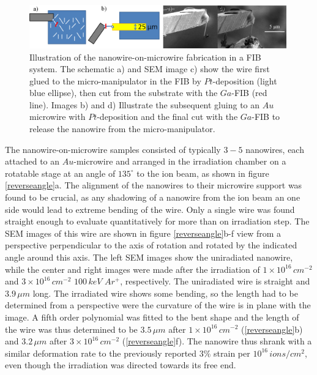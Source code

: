 \begin{figure}[thbp]
	\centering
		\includegraphics[width=0.99\textwidth]{images/reverseFIB.jpg}
	\caption{Illustration of the nanowire-on-microwire fabrication in a FIB system. The schematic a) and SEM image c) show the wire first glued to the micro-manipulator in the FIB by $Pt$-deposition (light blue ellipse), then cut from the substrate with the $Ga$-FIB (red line). Images b) and d) Illustrate the subsequent gluing to an $Au$ microwire with $Pt$-deposition and the final cut with the $Ga$-FIB to release the nanowire from the micro-manipulator.}
	\label{reverseFIB}
\end{figure}

The nanowire-on-microwire samples consisted of typically $3-5$ nanowires, each attached to an $Au$-microwire and arranged in the irradiation chamber on a rotatable stage at an angle of $135^\circ$ to the ion beam, as shown in figure \ref{reverseangle}a. The alignment of the nanowires to their microwire support was found to be crucial, as any shadowing of a nanowire from the ion beam an one side would lead to extreme bending of the wire. Only a single wire was found straight enough to evaluate quantitatively for more than on irradiation step. The SEM images of this wire are shown in figure \ref{reverseangle}b-f view from a perspective perpendicular to the axis of rotation and rotated by the indicated angle around this axis. The left SEM images show the uniradiated nanowire, while the center and right images were made after the irradiation of $1\times10^{16}\,cm^{-2}$ and $3\times10^{16}\,cm^{-2}$ $100\,keV\,\,Ar^+$, respectively. The uniradiated wire is straight and $3.9\,\mu m$ long. The irradiated wire shows some bending, so the length had to be determined from a perspective were the curvature of the wire is in plane with the image. A fifth order polynomial was fitted to the bent shape and the length of the wire was thus determined to be $3.5\,\mu m$ after $1\times10^{16}\,cm^{-2}$ (\ref{reverseangle}b) and $3.2\,\mu m$ after $3\times10^{16}\,cm^{-2}$ (\ref{reverseangle}f). The nanowire thus shrank with a similar deformation rate to the previously reported $3\%$ strain per $10^{16}\,ions/cm^2$, even though the irradiation was directed towards its free end.

